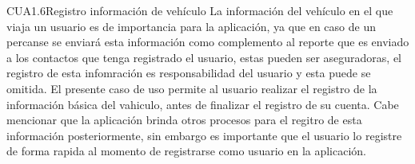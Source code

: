 
\begin{UseCase}{CUA1.6}{Registro información de vehículo}
    {
	La información del vehículo en el que viaja un usuario es de importancia para la aplicación, ya que en caso de un percanse se enviará esta información como complemento al reporte que es enviado a los contactos que tenga registrado el usuario, estas pueden ser aseguradoras, el registro de esta infomración es responsabilidad del usuario y esta puede se omitida. El presente caso de uso permite al usuario realizar el registro de la información básica del vahiculo, antes de finalizar el registro de su cuenta. Cabe mencionar que la aplicación brinda otros procesos para el regitro de esta información posteriormente, sin embargo es importante que el usuario lo registre de forma rapida al momento de registrarse como usuario en la aplicación.
    }

\end{UseCase}
